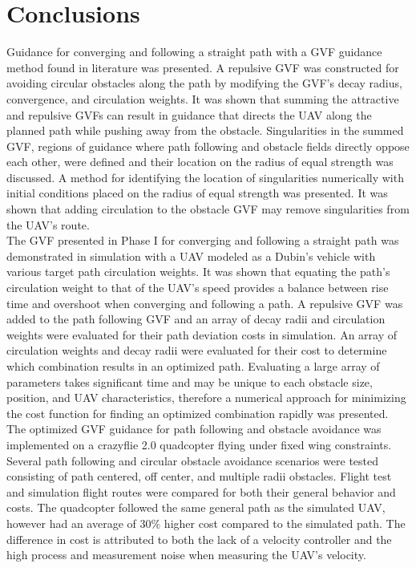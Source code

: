 \documentclass[numbered,pdftex]{ohio-etd}
\begin{document}
\chapter{Conclusions}


Guidance for converging and following a straight path with a GVF guidance method found in literature was presented. A repulsive GVF was constructed for avoiding circular obstacles along the path by modifying the GVF's decay radius, convergence, and circulation weights.  It was shown that summing the attractive and repulsive GVFs can result in guidance that directs the UAV along the planned path while pushing away from the obstacle. Singularities in the summed GVF, regions of guidance where path following and obstacle fields directly oppose each other, were defined and their location on the radius of equal strength was discussed. A method for identifying the location of singularities numerically with initial conditions placed on the radius of equal strength was presented. It was shown that adding circulation to the obstacle GVF may remove singularities from the UAV’s route. \\

The GVF presented in Phase I for converging and following a straight path was demonstrated in simulation with a UAV modeled as a Dubin's vehicle with various target path circulation weights. It was shown that equating the path’s circulation weight to that of the UAV’s speed provides a balance between rise time and overshoot when converging and following a path. A repulsive GVF was added to the path following GVF and an array of decay radii and circulation weights were evaluated for their path deviation costs in simulation. An array of circulation weights and decay radii were evaluated for their cost to determine which combination results in an optimized path.  Evaluating a large array of parameters takes significant time and may be unique to each obstacle size, position, and UAV characteristics, therefore a numerical approach for minimizing the cost function for finding an optimized combination rapidly was presented. \\

The optimized GVF guidance for path following and obstacle avoidance was implemented on a crazyflie 2.0 quadcopter flying under fixed wing constraints. Several path following and circular obstacle avoidance scenarios were tested consisting of path centered, off center, and multiple radii obstacles. Flight test and simulation flight routes were compared for both their general behavior and costs. The quadcopter followed the same general path as the simulated UAV, however had an average of $30 \%$ higher cost compared to the simulated path. The difference in cost is attributed to both the lack of a velocity controller and the high process and measurement noise when measuring the UAV’s velocity.  \\
\end{document}
